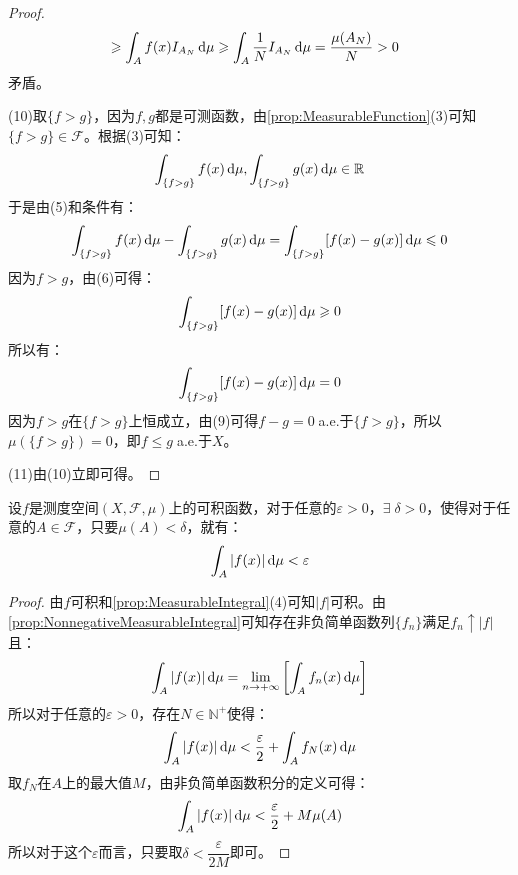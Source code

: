 \begin{proof}
\begin{align*}
		&\geqslant\int_{A}f(x)I_{A_N}\mathop{}\!\mathrm{d}\mu\geqslant\int_{A}\frac{1}{N}I_{A_N}\mathop{}\!\mathrm{d}\mu=\frac{\mu(A_N)}{N}>0
	\end{align*}
	矛盾。\par
	(10)取$\{f>g\}$，因为$f,g$都是可测函数，由\cref{prop:MeasurableFunction}(3)可知$\{f>g\}\in \mathscr{F}$。根据(3)可知：
	\begin{equation*}
		\int_{\{f>g\}}f(x)\mathop{}\!\mathrm{d}\mu,\int_{\{f>g\}}g(x)\mathop{}\!\mathrm{d}\mu\in\mathbb{R}^{}
	\end{equation*}
	于是由(5)和条件有：
	\begin{equation*}
		\int_{\{f>g\}}f(x)\mathop{}\!\mathrm{d}\mu-\int_{\{f>g\}}g(x)\mathop{}\!\mathrm{d}\mu=\int_{\{f>g\}}[f(x)-g(x)]\mathop{}\!\mathrm{d}\mu\leqslant0
	\end{equation*}
	因为$f>g$，由(6)可得：
	\begin{equation*}
		\int_{\{f>g\}}[f(x)-g(x)]\mathop{}\!\mathrm{d}\mu\geqslant0
	\end{equation*}
	所以有：
	\begin{equation*}
		\int_{\{f>g\}}[f(x)-g(x)]\mathop{}\!\mathrm{d}\mu=0
	\end{equation*}
	因为$f>g$在$\{f>g\}$上恒成立，由(9)可得$f-g=0\;$a.e.于$\{f>g\}$，所以$\mu(\{f>g\})=0$，即$f\leqslant g\;$a.e.于$X$。\par
	(11)由(10)立即可得。
\end{proof}
\begin{theorem}[积分的绝对连续性]
	设$f$是测度空间$(X,\mathscr{F},\mu)$上的可积函数，对于任意的$\varepsilon>0$，$\exists\;\delta>0$，使得对于任意的$A\in\mathscr{F}$，只要$\mu(A)<\delta$，就有：
	\begin{equation*}
		\int_{A}|f(x)|\mathop{}\!\mathrm{d}\mu<\varepsilon
	\end{equation*}
\end{theorem}
\begin{proof}
	由$f$可积和\cref{prop:MeasurableIntegral}(4)可知$|f|$可积。由\cref{prop:NonnegativeMeasurableIntegral}可知存在非负简单函数列$\{f_n\}$满足$f_n\uparrow |f|$且：
	\begin{equation*}
		\int_{A}|f(x)|\mathop{}\!\mathrm{d}\mu=\lim_{n\to+\infty}\left[\int_{A}f_n(x)\mathop{}\!\mathrm{d}\mu\right]
	\end{equation*}
	所以对于任意的$\varepsilon>0$，存在$N\in\mathbb{N}^+$使得：
	\begin{equation*}
		\int_{A}|f(x)|\mathop{}\!\mathrm{d}\mu<\frac{\varepsilon}{2}+\int_{A}f_N(x)\mathop{}\!\mathrm{d}\mu
	\end{equation*}
	取$f_N$在$A$上的最大值$M$，由非负简单函数积分的定义可得：
	\begin{equation*}
		\int_{A}|f(x)|\mathop{}\!\mathrm{d}\mu<\frac{\varepsilon}{2}+M\mu(A)
	\end{equation*}
	所以对于这个$\varepsilon$而言，只要取$\delta<\dfrac{\varepsilon}{2M}$即可。
\end{proof}
